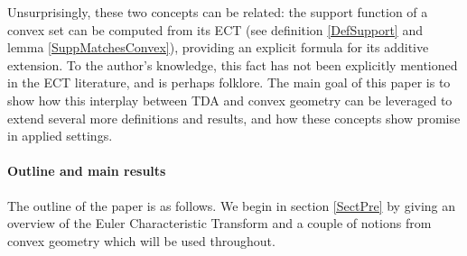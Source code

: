 \documentclass[a4paper]{article}
\begin{document}
Unsurprisingly, these two concepts can be related: the support function of a convex set can be computed from its ECT (see definition \ref{DefSupport} and lemma \ref{SuppMatchesConvex}), providing an explicit formula for its additive extension. To the author's knowledge, this fact has not been explicitly mentioned in the ECT literature, and is perhaps folklore. The main goal of this paper is to show how this interplay between TDA and convex geometry can be leveraged to extend several more definitions and results, and how these concepts show promise in applied settings.


\paragraph{Outline and main results} 
The outline of the paper is as follows. We begin in section \ref{SectPre} by giving an overview of the Euler Characteristic Transform and a couple of notions from convex geometry which will be used throughout.
\end{document}
